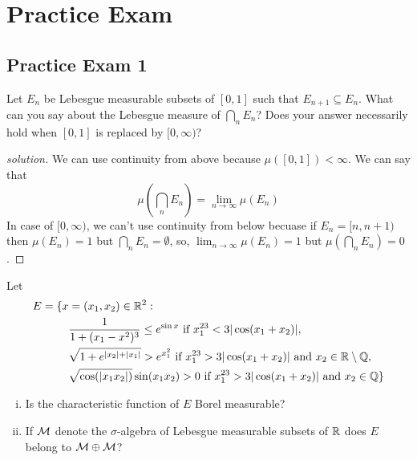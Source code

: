\chapter{Practice Exam}
\section{Practice Exam 1}
\begin{problem}
  Let $E_n$ be Lebesgue measurable subsets of $[0, 1]$ such that $E_{n+1} \subseteq E_n$.
  What can you say about the Lebesgue measure of $\bigcap_n E_n$? Does your answer
  necessarily hold when $[0, 1]$ is replaced by $[0, \infty)$?
\end{problem}
\begin{proof}[solution]
  We can use continuity from above because $\mu([0, 1]) < \infty$.
  We can say that $$\mu\left(\bigcap_n E_n\right) = \lim_{n \to \infty} \mu(E_n)$$
  In case of $[0, \infty)$, we can't use continuity from below becuase if $E_n = [n, n+1)$
  then $\mu(E_n) = 1$ but $\bigcap_n E_n = \emptyset$, so, $\lim_{n\to \infty}\mu(E_n) = 1$ but 
  $\mu\left(\bigcap_n E_n\right) = 0$.
\end{proof}

\begin{problem}
  Let 
  \begin{align*}
    E = \{x &= (x_1, x_2) \in \mathbb R^2 : \\
    &\frac1{1 + (x_1 - x^2)^3} \le e^{\sin x} \text{ if } x_1^{23} < 3|\cos(x_1 + x_2)|, \\
    &\sqrt{1 + e^{|x_2| + |x_1|}} > e^{x_1^2} \text{ if } x_1^{23} > 3|\cos(x_1 + x_2)|\text{ and }x_2 \in \mathbb R\setminus\mathbb Q, \\
    &\sqrt{\cos(|x_1x_2|)}\sin(x_1x_2) > 0 \text{ if } x_1^{23} > 3|\cos(x_1 + x_2)|\text{ and }x_2 \in \mathbb Q\}
  \end{align*}
  \begin{enumerate}[(i)]
    \item Is the characteristic function of $E$ Borel measurable?
    \item If $\mathcal M$ denote the $\sigma$-algebra of Lebesgue measurable subsets of $\mathbb R$ does $E$ belong to $\mathcal M \oplus \mathcal M$?
  \end{enumerate}
\end{problem}

